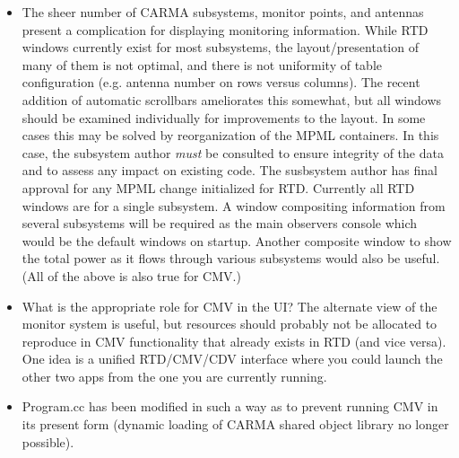 \documentclass[preprint]{aastex}
\begin{document}
\begin{itemize}

\item The sheer number of CARMA subsystems, monitor points, and antennas
present a complication for displaying monitoring information.  
While RTD
windows currently exist for most subsystems, the layout/presentation of many
of them is not optimal, and there is not uniformity of table configuration
(e.g. antenna number on rows versus columns).  
The recent addition of automatic scrollbars ameliorates this somewhat,
but all windows should be examined individually for improvements to the
layout.  In some cases this may be solved by reorganization of the MPML
containers.  In this case, the subsystem author {\it must} be consulted to
ensure integrity of the data and to assess any impact on existing code.
The susbsystem author has final approval for any MPML change initialized
for RTD.  Currently all RTD windows are for a single subsystem.  
A window compositing information from several subsystems will be required
as the main observers console which would be the default windows on startup.
Another composite window to show the total power as it flows through
various subsystems would also be useful.
(All of the above is also true for CMV.)

\item What is the appropriate role for CMV in the UI?  The alternate view
of the monitor system is useful, but resources should probably not be
allocated to reproduce in CMV functionality that already exists in RTD
(and vice versa).  One idea is a unified RTD/CMV/CDV interface where you
could launch the other two apps from the one you are currently running.

\item Program.cc has been modified in such a way as to prevent
running CMV in its present form (dynamic loading of CARMA shared object  
library no longer possible).


\end{itemize}
\end{document}

